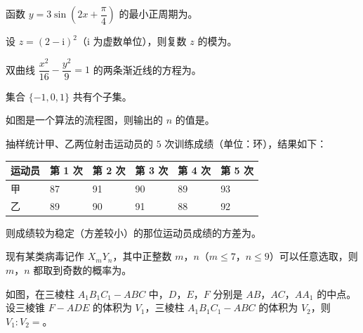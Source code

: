 \begin{question}
函数 $y=3\sin\left(2x+\dfrac{\pi}{4}\right)$ 的最小正周期为\gkblank{}。

\end{question}
\begin{question}
设 $z=(2-\mathrm i)^2$（$\mathrm i$ 为虚数单位），则复数 $z$ 的模为\gkblank{}。

\end{question}
\begin{question}
双曲线 $\dfrac{x^2}{16}-\dfrac{y^2}{9}=1$ 的两条渐近线的方程为\gkblank{}。

\end{question}
\begin{question}
集合 $\{-1,0,1\}$ 共有\gkblank{}个子集。

\Needspace{0.4\textheight}
\end{question}
\begin{question}
如图是一个算法的流程图，则输出的 $n$ 的值是\gkblank{}。
\nopagebreak[4]
\begin{center}\end{center}
\nopagebreak[4]
\end{question}
\begin{question}
抽样统计甲、乙两位射击运动员的 $5$ 次训练成绩（单位：环），结果如下：

\begin{center}
\begin{tabular}{llllll}
\toprule
运动员 & 第 1 次 & 第 2 次 & 第 3 次 & 第 4 次 & 第 5 次 \\
\midrule
甲 & 87 & 91 & 90 & 89 & 93 \\
乙 & 89 & 90 & 91 & 88 & 92 \\
\bottomrule
\end{tabular}
\end{center}

则成绩较为稳定（方差较小）的那位运动员成绩的方差为\gkblank{}。

\end{question}
\begin{question}
现有某类病毒记作 $X_mY_n$，其中正整数 $m$，$n$（$m\leqslant7$，$n\leqslant9$）可以任意选取，则 $m$，$n$ 都取到奇数的概率为\gkblank{}。

\Needspace{0.4\textheight}
\end{question}
\begin{question}
如图，在三棱柱 $A_1B_1C_1-ABC$ 中，$D$，$E$，$F$ 分别是 $AB$，$AC$，$AA_1$ 的中点。设三棱锥 $F-ADE$ 的体积为 $V_1$，三棱柱 $A_1B_1C_1-ABC$ 的体积为 $V_2$，则 $V_1:V_2=$\gkblank{}。
\nopagebreak[4]
\begin{center}\end{center}
\nopagebreak[4]
\end{question}
